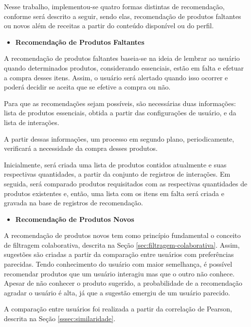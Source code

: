 Nesse trabalho, implementou-se quatro formas distintas de recomendação, conforme será descrito a seguir, sendo elas, recomendação de produtos faltantes ou novos além de receitas a partir do conteúdo disponível ou do perfil.

\begin{itemize}
    \item \textbf{Recomendação de Produtos Faltantes}
\end{itemize}

A recomendação de produtos faltantes baseia-se na ideia de lembrar ao usuário quando determinados produtos, considerando essenciais, estão em falta e efetuar a compra desses itens. Assim, o usuário será alertado quando isso ocorrer e poderá decidir se aceita que se efetive a compra ou não.

Para que as recomendações sejam possíveis, são necessárias duas informações: lista de produtos essenciais, obtida a partir das configurações de usuário, e da lista de interações. 

A partir dessas informações, um processo em segundo plano, periodicamente, verificará a necessidade da compra desses produtos.

Inicialmente, será criada uma lista de produtos contidos atualmente e suas respectivas quantidades, a partir da conjunto de registros de interações. Em seguida, será comparado produtos requisitados com as respectivas quantidades de produtos existentes e, então, uma lista com os itens em falta será criada e gravada na base de registros de recomendação.

\begin{itemize}
    \item \textbf{Recomendação de Produtos Novos}
\end{itemize}

A recomendação de produtos novos tem como princípio fundamental o conceito de filtragem colaborativa, descrita na Seção \ref{sec:filtragem-colaborativa}. Assim, sugestões são criadas a partir da comparação entre usuários com preferências parecidas. Tendo conhecimento do usuário com maior semelhança, é possível recomendar produtos que um usuário interagiu mas que o outro não conhece. Apesar de não conhecer o produto sugerido, a probabilidade de a recomendação agradar o usuário é alta, já que a sugestão emergiu de um usuário parecido.

A comparação entre usuários foi realizada a partir da correlação de Pearson, descrita na Seção \ref{sssec:similaridade}.


